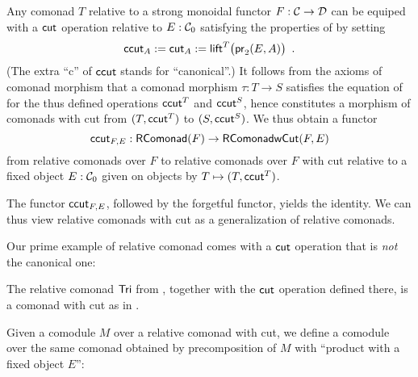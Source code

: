 \documentclass[conference,10pt]{IEEEtran}
\begin{document}
\begin{remark}\label{canonical_cut}
 Any comonad $T$ relative to a strong monoidal functor $F:{\mathcal{C}}\to\mathcal{D}$  can be equiped with a $\mathsf{cut}$ operation relative to 
 $E:{\mathcal{C}}_0$ satisfying the properties of  by setting
   \[ \mathsf{ccut}_A := \mathsf{cut}_A := \mathsf{lift}^T\bigl(\mathsf{pr}_2(E,A)\bigr) \enspace . \]
 (The extra \enquote{c} of $\mathsf{ccut}$ stands for \enquote{canonical}.)
 It follows from the axioms of comonad morphism that a comonad morphism $\tau : T\to S$ satisfies the equation of  
 for the thus defined operations $\mathsf{ccut}^T$ and $\mathsf{ccut}^S$, hence constitutes a morphism of comonads with cut from $(T,\mathsf{ccut}^T)$ to $(S,\mathsf{ccut}^S)$.
 We thus obtain a functor 
 \[ \mathsf{ccut}_{F,E} : \mathsf{RComonad}(F) \to \mathsf{\mathsf{RComonad} wCut}(F,E)\]
 from relative comonads over $F$ to relative comonads over $F$ with cut relative to a fixed object $E:{\mathcal{C}}_0$ given on 
 objects by $T\mapsto (T,\mathsf{ccut}^T)$.
\end{remark}

The functor $\mathsf{ccut}_{F,E}$, followed by the forgetful functor, yields the identity. We can thus view
relative comonads with cut as a generalization of relative comonads.


Our prime example of relative comonad comes with a $\mathsf{cut}$ operation that is \emph{not} the canonical one:

\begin{example}\label{def:cut_for_tri}
  The relative comonad $\mathsf{Tri}$ from , together with the $\mathsf{cut}$ operation defined there, 
  is a comonad with cut as in .
\end{example}





Given a comodule $M$ over a relative comonad with cut, we define a comodule over the same comonad obtained by precomposition of $M$ with
\enquote{product with a fixed object $E$}:
\end{document}
